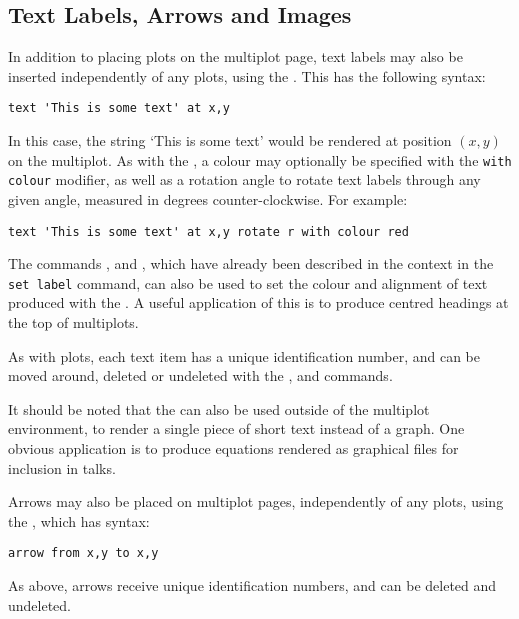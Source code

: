 \subsection{Text Labels, Arrows and Images}

\label{text_command} In addition to placing plots on the multiplot page, text
labels may also be inserted independently of any plots, using the
. This has the following syntax:

\begin{verbatim} 
text 'This is some text' at x,y
\end{verbatim}

In this case, the string `This is some text' would be rendered at position
$(x,y)$ on the multiplot. As with the , a colour may
optionally be specified with the {\tt with colour} modifier, as well as a
rotation angle to rotate text labels through any given angle, measured in
degrees counter-clockwise. For example:

\begin{verbatim} 
text 'This is some text' at x,y rotate r with colour red
\end{verbatim}

The commands ,  and
, which have already been described in the context in
the {\tt set label} command, can also be used to set the colour and alignment
of text produced with the .  A useful application of this is to
produce centred headings at the top of multiplots.

As with plots, each text item has a unique identification number, and can be
moved around, deleted or undeleted with the ,
 and  commands.

It should be noted that the  can also be used outside of the
multiplot environment, to render a single piece of short text instead of a
graph. One obvious application is to produce equations rendered as graphical
files for inclusion in talks.

\label{arrows} Arrows may also be placed on multiplot pages, independently of
any plots, using the , which has syntax:

\begin{verbatim} 
arrow from x,y to x,y
\end{verbatim}

As above, arrows receive unique identification numbers, and can be deleted and
undeleted.

